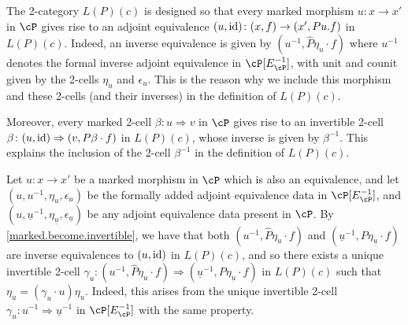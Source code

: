 \documentclass[11pt, dvipsnames]{amsart}
\begin{document}
    \begin{rmk}\label{marked.become.invertible}
        The 2-category $L(P)(c)$ is designed so that every marked morphism $u\colon x\to x'$ in $\cP$ gives rise to an adjoint equivalence $(u,\mathrm{id})\colon (x, f)\to (x', Pu.f)$ in $L(P)(c)$. Indeed, an inverse equivalence is given by $(u^{-1},\widehat{P}\eta_u\cdot f)$ where $u^{-1}$ denotes the formal inverse adjoint equivalence in $\cP[E_\cP^{-1}]$, with unit and counit given by the 2-cells $\eta_u$ and $\epsilon_u$. This is the reason why we include this morphism and these 2-cells (and their inverses) in the definition of $L(P)(c)$.

        Moreover, every marked 2-cell $\beta\colon u\Rightarrow v$ in $\cP$ gives rise to an invertible 2-cell $\beta\colon (u,\mathrm{id})\Rightarrow (v,P\beta\cdot f)$ in $L(P)(c)$, whose inverse is given by $\beta^{-1}$. This explains the inclusion of the 2-cell $\beta^{-1}$ in the definition of $L(P)(c)$. 
      \end{rmk}

      \begin{rmk}\label{gamma.u.exists}
      Let $u\colon x\to x'$ be a marked morphism in $\cP$ which is also an equivalence, and let $(u,u^{-1},\eta_u,\epsilon_u)$ be the formally added adjoint equivalence data in $\cP[E_\cP^{-1}]$, and   $(u,\underline{u}^{-1},\eta_{\underline{u}},\epsilon_{\underline{u}})$ be any adjoint equivalence data present in $\cP$. By \cref{marked.become.invertible}, we have that both $ (u^{-1}, \widehat{P}\eta_u\cdot f)$ and $(\underline{u}^{-1}, P\eta_{\underline{u}}\cdot f)$ are inverse equivalences to $(u,\mathrm{id})$ in $L(P)(c)$, and so there exists a unique invertible 2-cell  $\gamma_u\colon (u^{-1}, \widehat{P}\eta_u\cdot f)\Rightarrow (\underline{u}^{-1}, P\eta_{\underline{u}}\cdot f)$ in $L(P)(c)$ such that $\eta_{\underline{u}}=(\gamma_u\cdot u)\eta_u$. Indeed, this arises from the unique invertible 2-cell  $\gamma_u\colon u^{-1}\Rightarrow \underline{u}^{-1}$  in $\cP[E_\cP^{-1}]$ with the same property.
      \end{rmk}
\end{document}

